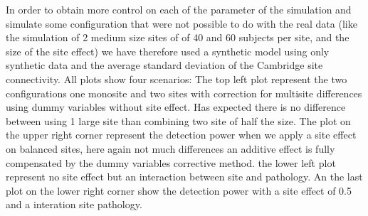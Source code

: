 \documentclass[authoryear]{elsarticle}
\begin{document}
In order to obtain more control on each of the parameter of the simulation and simulate some configuration that were not possible to do with the real data (like the simulation of 2 medium size sites of of 40 and 60 subjects per site, and the size of the site effect) we have therefore used a synthetic model using only synthetic data and the average standard deviation of the Cambridge site connectivity. All plots show four scenarios: The top left plot represent the two configurations one monosite and two sites with correction for multisite differences using dummy variables without site effect. Has expected there is no difference between using 1 large site than combining two site of half the size. The plot on the upper right corner represent the detection power when we apply a site effect on balanced sites, here again not much differences an additive effect is fully compensated by the dummy variables corrective method. the lower left plot represent no site effect but an interaction between site and pathology. An the last plot on the lower right corner show the detection power with a site effect of 0.5 and a interation site pathology.
\end{document}
